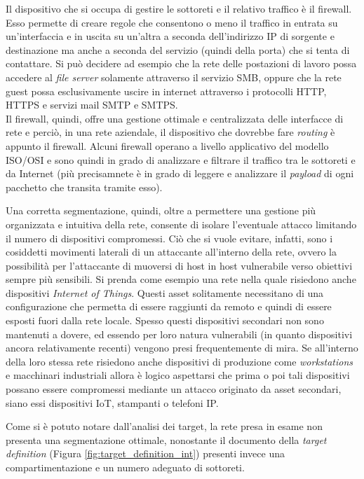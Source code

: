 \documentclass[target=bach,aauheader=]{thud}
\begin{document}
Il dispositivo che si occupa di gestire le sottoreti e il relativo traffico è il firewall. Esso permette di creare regole che consentono o meno il traffico in entrata su un'interfaccia e in uscita su un'altra a seconda dell'indirizzo IP di sorgente e destinazione ma anche a seconda del servizio (quindi della porta) che si tenta di contattare. Si può decidere ad esempio che la rete delle postazioni di lavoro possa accedere al \textit{file server} solamente attraverso il servizio SMB, oppure che la rete guest possa esclusivamente uscire in internet attraverso i protocolli HTTP, HTTPS e servizi mail SMTP e SMTPS.
\\ Il firewall, quindi, offre una gestione ottimale e centralizzata delle interfacce di rete e perciò, in una rete aziendale, il dispositivo che dovrebbe fare \textit{routing} è appunto il firewall. Alcuni firewall operano a livello applicativo del modello ISO/OSI e sono quindi in grado di analizzare e filtrare il traffico tra le sottoreti e da Internet (più precisamnete è in grado di leggere e analizzare il \textit{payload} di ogni pacchetto che transita tramite esso).

Una corretta segmentazione, quindi, oltre a permettere una gestione più organizzata e intuitiva della rete, consente di isolare l'eventuale attacco limitando il numero di dispositivi compromessi. Ciò che si vuole evitare, infatti, sono i cosiddetti movimenti laterali di un attaccante all'interno della rete, ovvero la possibilità per l'attaccante di muoversi di host in host vulnerabile verso obiettivi sempre più sensibili. Si prenda come esempio una rete nella quale risiedono anche dispositivi \textit{Internet of Things}. Questi asset solitamente necessitano di una configurazione che permetta di essere raggiunti da remoto e quindi di essere esposti fuori dalla rete locale. Spesso questi dispositivi secondari non sono mantenuti a dovere, ed essendo per loro natura vulnerabili (in quanto dispositivi ancora relativamente recenti) vengono presi frequentemente di mira. Se all'interno della loro stessa rete risiedono anche dispositivi di produzione come \textit{workstations} e macchinari industriali allora è logico aspettarsi che prima o poi tali dispositivi possano essere compromessi mediante un attacco originato da asset secondari, siano essi dispositivi IoT, stampanti o telefoni IP.

Come si è potuto notare dall'analisi dei target, la rete presa in esame non presenta una segmentazione ottimale, nonostante il documento della \textit{target definition} (Figura \ref{fig:target_definition_int}) presenti invece una compartimentazione e un numero adeguato di sottoreti.
\end{document}
